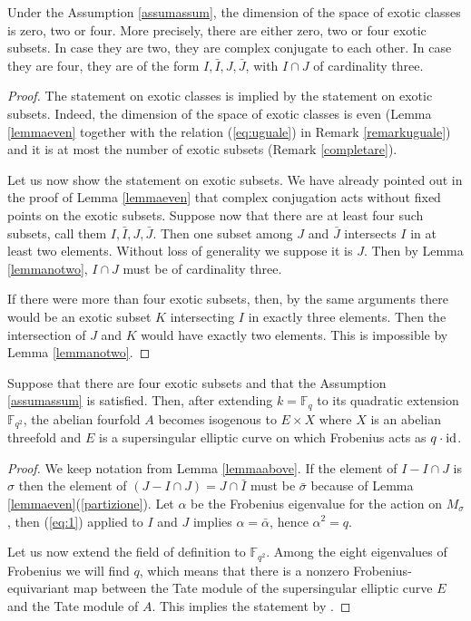 \documentclass[11pt]{amsart}
\begin{document}
\begin{lemma}\label{lemmaabove}
Under the Assumption \ref{assumassum}, the dimension of the space of exotic classes is zero, two or four. More precisely, there are either  zero, two or four exotic subsets. In case they are two, they are  complex conjugate to each other. In case they are four, they are of the form $I,\bar{I}, J, \bar{J}$, with $I\cap J$ of cardinality three.
 \end{lemma}
\begin{proof}
The statement on exotic classes is implied by the statement on exotic subsets. Indeed, the dimension of the space of exotic classes is even (Lemma \ref{lemmaeven} together with the relation (\ref{eq:uguale}) in Remark \ref{remarkuguale}) and it is  at most the number of exotic subsets (Remark \ref{completare}).


Let us now show the statement on exotic subsets. We have already pointed out in the proof of Lemma \ref{lemmaeven} that  complex conjugation acts without fixed points on the exotic subsets. Suppose now that there are at least four such subsets, call them $I,\bar{I}, J, \bar{J}$. Then one subset among $J$ and $\bar{J}$ intersects $I$ in at least two elements. Without loss of generality we suppose it is $J$. Then by Lemma \ref{lemmanotwo}, $I\cap J$ must be of cardinality three.

If there were more than four exotic subsets, then, by the same arguments there would be an exotic subset $K$ intersecting $I$ in exactly three elements. Then the intersection of $J$ and $K$ would have exactly two elements. This is impossible  by Lemma \ref{lemmanotwo}.
\end{proof}

\begin{lemma}\label{lemmafour}
Suppose that there are four exotic subsets and that the Assumption   \ref{assumassum} is satisfied. Then, after extending $k= \mathbb{F}_{q}$ to its quadratic extension $\mathbb{F}_{q^2}$, the abelian fourfold $A$ becomes isogenous to  $E\times X$ where  $X$ is an abelian threefold and $E$ is a supersingular elliptic curve on which   Frobenius acts as $q\cdot \mathrm{id} $. 


\end{lemma}
 
\begin{proof}
We keep notation from Lemma \ref{lemmaabove}. If the element of $I-I\cap J$ is $\sigma$ then the element of  $(J-I\cap J)= J \cap \bar{I}$ must be $\bar{\sigma}$ because of  Lemma \ref{lemmaeven}(\ref{partizione}).  Let $\alpha$ be the Frobenius eigenvalue for the action on $M_\sigma$, then  (\ref{eq:1}) applied to $I$ and $J$ implies $\alpha=\bar{\alpha}$, hence $\alpha^2=q$.

Let us now extend the field of definition to $\mathbb{F}_{q^2}$. Among the eight eigenvalues of  Frobenius we will find $q$, which means that there is a nonzero Frobenius-equivariant map between the Tate module of the supersingular elliptic curve $E$ and the Tate module of $A$. This implies the statement by  \cite[Theorem 4]{Tate}.
\end{proof}
\end{document}
